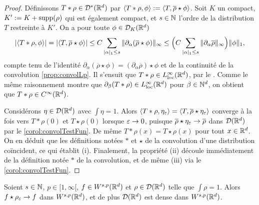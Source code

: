 \begin{proof}
Définissons $T*\rho \in \mathcal{D}^*(\mathbb{R}^d)$ par $\langle T * \rho,\phi\rangle := \langle T,\overline \rho \star \phi\rangle$.
Soit $K$ un compact, $K' := K + \operatorname{supp}(\rho)$ qui est également compact, et $s\in \mathbb{N}$ l'ordre de la distribution $T$ restreinte à $K'$. On a pour toute $\phi \in \mathcal{D}_K(\mathbb{R}^d)$
\begin{equation*}
	|\langle T*\rho,\phi\rangle| 
	= |\langle T,\overline \rho \star \phi\rangle| 
	\leq C \sum_{|\alpha|_1 \leq s} \|\partial_\alpha(\overline \rho \star \phi)\|_\infty 
	\leq \Big(C \sum_{|\alpha|_1 \leq s} \|\partial_\alpha \overline \rho\|_\infty\Big) \|\phi\|_1,
\end{equation*}
compte tenu de l'identité $\partial_\alpha(\overline \rho \star \phi) = (\partial_\alpha\overline \rho) \star \phi$ et de la continuité de la convolution \cref{prop:convolLp}.
Il s'ensuit que $T * \rho \in L^\infty_{\mathrm{loc}}(\mathbb{R}^d)$, par le . Comme le même raisonnement montre que $\partial_\beta (T * \rho) \in L^\infty_{\mathrm{loc}}(\mathbb{R}^d)$ pour $\beta \in \mathbb{N}^d$, on obtient que $T * \rho \in C^\infty(\mathbb{R}^d)$.

Considérons  $\eta \in \mathcal{D}(\mathbb{R}^d)$ avec $\int \eta = 1$. Alors $\langle T * \rho, \eta_\varepsilon \rangle = \langle T,\overline \rho \star \eta_\varepsilon\rangle$ converge à la fois vers $T*\rho(0)$ et $T\star \rho(0)$ lorsque $\varepsilon\to 0$, puisque $\overline \rho \star \eta_\varepsilon \to \overline \rho$ dans $\mathcal{D}(\mathbb{R}^d)$ par le  \cref{corol:convolTestFun}.  De même $T*\rho(x)=T\star \rho(x)$ pour tout $x \in \mathbb{R}^d$.
On en déduit que les définitions notées $*$ et $\star$ de la convolution d'une distribution coïncident, ce qui établit (i). 
Finalement, la propriété (ii) découle immédiatement de la définition notée $*$ de la convolution, et de même (iii) via le \cref{corol:convolTestFun}. 
\end{proof}

\begin{proposition}
\label{prop:testDenseWsp}
%
	Soient $s\in \mathbb{N}$, $p \in [1,\infty[$, $f \in W^{s,p}( \mathbb{R}^d)$ et $\rho \in \mathcal{D}(\mathbb{R}^d)$ telle que $\int \rho=1$. Alors 
	$f \star \rho_\varepsilon \to f$ dans $W^{s,p}(\mathbb{R}^d)$, et de plus $\mathcal{D}(\mathbb{R}^d)$ est dense dans $W^{s,p}(\mathbb{R}^d)$. 
\end{proposition}

